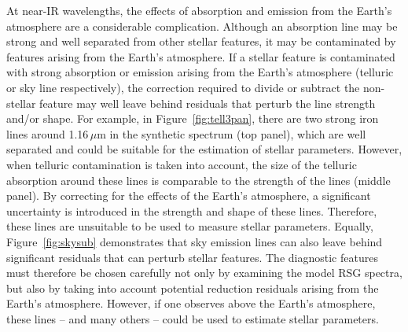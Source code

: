 At near-IR wavelengths, the effects of absorption and emission from the Earth's atmosphere are a considerable complication.
Although an absorption line may be strong and well separated from other stellar features, it may be contaminated by features arising from the Earth's atmosphere.
If a stellar feature is contaminated with strong absorption or emission arising from the Earth's atmosphere (telluric or sky line respectively), the correction required to divide or subtract the non-stellar feature may well leave behind residuals that perturb the line strength and/or shape.
For example, in Figure~\ref{fig:tell3pan}, there are two strong iron lines around 1.16\,$\mu$m in the synthetic spectrum (top panel), which are well separated and could be suitable for the estimation of stellar parameters.
However, when telluric contamination is taken into account, the size of the telluric absorption around these lines is comparable to the strength of the lines (middle panel).
By correcting for the effects of the Earth's atmosphere, a significant uncertainty is introduced in the strength and shape of these lines.
Therefore, these lines are unsuitable to be used to measure stellar parameters.
Equally, Figure~\ref{fig:skysub} demonstrates that sky emission lines can also leave behind significant residuals that can perturb stellar features.
The diagnostic features must therefore be chosen carefully not only by examining the model RSG spectra, but also by taking into account potential reduction residuals arising from the Earth's atmosphere.
However, if one observes above the Earth's atmosphere, these lines -- and many others -- could be used to estimate stellar parameters.

